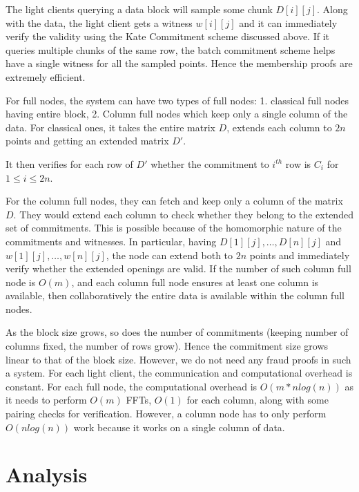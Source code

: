 \documentclass[sigconf, screen=true, nonacm]{acmart}
\begin{document}
        The light clients querying a data block will sample some chunk $D[i][j]$. Along with the data, the light client gets a witness $w[i][j]$ and it can immediately verify the validity using the Kate Commitment scheme discussed above. If it queries multiple chunks of the same row, the batch commitment scheme helps have a single witness for all the sampled points. Hence the membership proofs are extremely efficient. 

        For full nodes, the system can have two types of full nodes: 1. classical full nodes having entire block, 2. Column full nodes which keep only a single column of the data. For classical ones, it takes the entire matrix $D$, extends each column to $2n$ points and getting an extended matrix $D'$. 

        It then verifies for each row of $D'$ whether the commitment to $i^{th}$ row is $C_i$ for $1 \leq i \leq 2n$. 

        For the column full nodes, they can fetch and keep only a column of the matrix $D$. They would extend each column to check whether they belong to the extended set of commitments. This is possible because of the homomorphic nature of the commitments and witnesses. In particular, having $D[1][j], \dots,\allowbreak D[n][j]$ and $w[1][j],\allowbreak \dots, w[n][j]$, the node can extend both to $2n$ points and immediately verify whether the extended openings are valid. If the number of such column full node is $O(m)$, and each column full node ensures at least one column is available, then collaboratively the entire data is available within the column full nodes. 

        As the block size grows, so does the number of commitments (keeping number of columns fixed, the number of rows grow). Hence the commitment size grows linear to that of the block size. However, we do not need any fraud proofs in such a system. For each light client, the communication and computational overhead is constant. For each full node, the computational overhead is $O(m*n log(n))$ as it needs to perform $O(m)$ FFTs, $O(1)$ for each column, along with some pairing checks for verification. However, a column node has to only perform $O(n log(n))$ work because it works on a single column of data. 


\section{Analysis}
\end{document}
